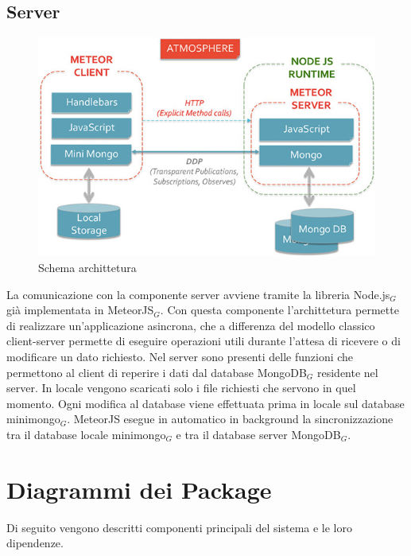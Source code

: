\subsection{Server}

\begin{figure}[h]
\begin{center}
\includegraphics[scale=0.35]{img/meteor_architettura.jpg}
\caption{Schema archittetura}
\end{center}
\end{figure}

La comunicazione con la componente server avviene tramite la libreria Node.js$_G$ già implementata in MeteorJS$_G$. Con questa componente l'archittetura permette di realizzare un'applicazione asincrona, che a differenza del modello classico client-server permette di eseguire operazioni utili durante l'attesa di ricevere o di modificare un dato richiesto.
Nel server sono presenti delle funzioni che permettono al client di reperire i dati dal database MongoDB$_G$ residente nel server. In locale vengono scaricati solo i file richiesti che servono in quel momento. Ogni modifica al database viene effettuata prima in locale sul database minimongo$_G$. MeteorJS esegue in automatico in background la sincronizzazione tra il database locale minimongo$_G$ e tra il database server MongoDB$_G$.
\clearpage
\newpage
\section{Diagrammi dei Package}
Di seguito vengono descritti componenti principali del sistema e le loro dipendenze.

